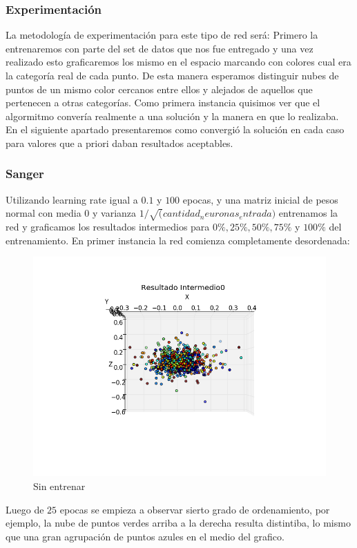 \subsubsection{Experimentación}

La metodología de experimentación para este tipo de red será:
Primero la entrenaremos con parte del set de datos que nos fue entregado y una vez realizado esto graficaremos los mismo en el espacio marcando con colores cual era la categoría real de cada punto. De esta manera esperamos distinguir nubes de puntos de un mismo color cercanos entre ellos y alejados de aquellos que pertenecen a otras categorías. Como primera instancia quisimos ver que el algormitmo convería realmente a una solución y la manera en que lo realizaba. En el siguiente apartado presentaremos como convergió la solución en cada caso para valores que a priori daban resultados aceptables.

\subsubsection{Sanger}

Utilizando learning rate igual a $0.1$ y $100$ epocas, y una matriz inicial de pesos normal con media 0 y varianza $1/\sqrt(cantidad_neuronas_entrada)$ entrenamos la red y graficamos los resultados intermedios para $0\%,25\%, 50\%, 75\%$ y $100\%$ del entrenamiento. En primer instancia la red comienza completamente desordenada:

\begin{figure}[h!]
\centering
  \centering
  \includegraphics[width=.6\linewidth]{convergencia_oja/0.png}
\caption{Sin entrenar}
\label{fig:test}
\end{figure}


\pagebreak

Luego de $25$ epocas se empieza a observar sierto grado de ordenamiento, por ejemplo, la nube de puntos verdes arriba a la derecha resulta distintiba, lo mismo que una gran agrupación de puntos azules en el medio del grafico.

